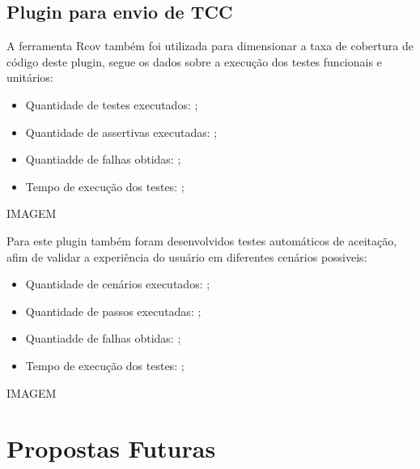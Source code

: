 \subsection{Plugin para envio de TCC}

A ferramenta Rcov também foi utilizada para dimensionar a taxa de cobertura de código deste plugin, segue os dados sobre a execução dos testes funcionais e unitários:
\begin{itemize}
\item Quantidade de testes executados: \textbf{};
\item Quantidade de assertivas executadas: \textbf{};
\item Quantiadde de falhas obtidas: \textbf{};
\item Tempo de execução dos testes: \textbf{};
\end{itemize}

IMAGEM

Para este plugin também foram desenvolvidos testes automáticos de aceitação, afim de validar a experiência do usuário em diferentes cenários possiveis:
\begin{itemize}
\item Quantidade de cenários executados: \textbf{};
\item Quantidade de passos executadas: \textbf{};
\item Quantiadde de falhas obtidas: \textbf{};
\item Tempo de execução dos testes: \textbf{};
\end{itemize}

IMAGEM

\section{Propostas Futuras}

